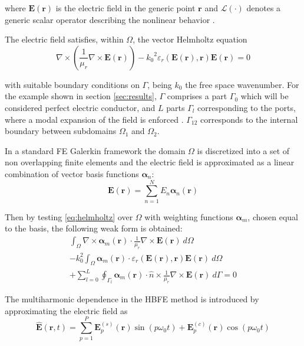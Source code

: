 \documentclass[journal]{IEEEtran}
\renewcommand{\vec}[1]{\mathbf{#1}}
\begin{document}
\noindent where $\vec{E}(\vec{r})$ is the electric field in the generic point
$\vec{r}$ and $\mathcal{L}(\cdot)$ denotes a generic scalar operator describing the
nonlinear behavior \cite{Guarnieri2010}. 

The electric field satisfies, within $\Omega$, the vector Helmholtz equation
%
\begin{equation}
\label{eq:helmholtz}
\nabla \times \left ( \frac{1}{\mu_r} \nabla \times \vec{E}(\vec{r}) \right )  - {k_0}^2 
\varepsilon_r \left(\vec{E}(\vec{r}), \vec{r} \right) \vec{E}(\vec{r}) = 0
\end{equation} 

\noindent with suitable boundary conditions on $\Gamma$, being $k_0$ the free
space wavenumber. For the example shown in section \ref{sec:results}, $\Gamma$
comprises a part $\Gamma_0$ which will be considered perfect electric conductor, and $L$ parts $\Gamma_l$
corresponding to the ports, where a modal expansion of the field is enforced \cite{Pelosi2009}. 
$\Gamma_{12}$ corresponds to the internal boundary between subdomains $\Omega_1$ and $\Omega_2$.

In a standard FE Galerkin framework the domain $\Omega$ is
discretized into a set of non overlapping finite elements and the electric
field is approximated as a linear combination of vector basis functions $\boldsymbol{\alpha}_n$:
%
\begin{equation}\label{e:femexpansion}
\vec{E}(\vec{r})  = \sum_{n=1}^N E_n \boldsymbol{\alpha}_n(\vec{r})
\end{equation} 

Then by testing \eqref{eq:helmholtz} over $\Omega$ with weighting functions
 $\boldsymbol{\alpha}_m$, chosen equal to the basis, the following weak form is
 obtained:
%
\begin{multline}\label{eq:fem}
\int_\Omega \nabla \times \boldsymbol{\alpha}_m (\vec{r}) \cdot \frac{1}{\mu_r}
\nabla \times \vec{E}(\vec{r}) \ d\Omega \\
- k_0^2 \int_\Omega  \boldsymbol{\alpha}_m (\vec{r}) \cdot \varepsilon_r 
(\vec{E}(\vec{r}), \vec{r}) \vec{E}(\vec{r}) \ d\Omega \\
+ \sum_{l=0}^{L}\oint_{\Gamma_l} \boldsymbol{\alpha}_m (\vec{r}) \cdot \hat{n} \times \frac{1}{\mu_r} 
\nabla \times \vec{E}(\vec{r}) \ d\Gamma = 0
\end{multline} 


The multiharmonic dependence in the HBFE method is introduced by approximating
the electric field as \cite{Bachinger2005}
%
\begin{equation} \label{eq:field}
\vec{\hat{E}}(\vec{r}, t) = \sum^P_{p=1} \vec{E}_{p}^{(s)}(\vec{r}) \sin(p
\omega_0 t) + \vec{E}_p^{(c)}(\vec{r}) \cos(p \omega_0 t)
\end{equation} 
\end{document}
